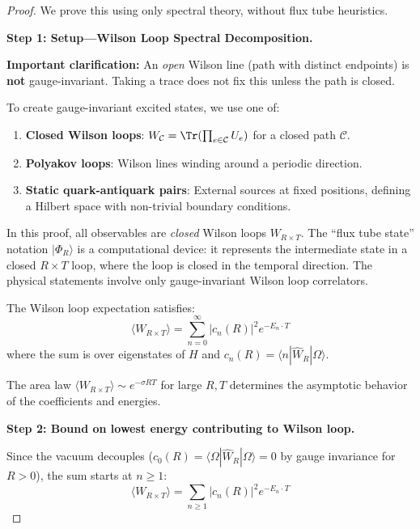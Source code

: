\begin{proof}
We prove this using only spectral theory, without flux tube heuristics.

\textbf{Step 1: Setup---Wilson Loop Spectral Decomposition.}

\begin{tcolorbox}[colback=yellow!5, colframe=yellow!75!black, title=\textbf{Gauge Invariance---Rigorous Treatment}]
\textbf{Important clarification:} An \emph{open} Wilson line (path with distinct 
endpoints) is \textbf{not} gauge-invariant. Taking a trace does not fix this 
unless the path is closed.

To create gauge-invariant excited states, we use one of:
\begin{enumerate}
\item \textbf{Closed Wilson loops}: $W_{\mathcal{C}} = \Tr(\prod_{e \in \mathcal{C}} U_e)$ 
for a closed path $\mathcal{C}$.
\item \textbf{Polyakov loops}: Wilson lines winding around a periodic direction.
\item \textbf{Static quark-antiquark pairs}: External sources at fixed positions, 
defining a Hilbert space with non-trivial boundary conditions.
\end{enumerate}

In this proof, all observables are \emph{closed} Wilson loops $W_{R \times T}$. 
The ``flux tube state'' notation $|\Phi_R\rangle$ is a computational device: 
it represents the intermediate state in a closed $R \times T$ loop, where the 
loop is closed in the temporal direction. The physical statements involve only 
gauge-invariant Wilson loop correlators.
\end{tcolorbox}

The Wilson loop expectation satisfies:
\[
\langle W_{R \times T} \rangle = \sum_{n=0}^\infty |c_n(R)|^2 e^{-E_n \cdot T}
\]
where the sum is over eigenstates of $H$ and $c_n(R) = \langle n | \hat{W}_R | \Omega \rangle$.

The area law $\langle W_{R \times T} \rangle \sim e^{-\sigma R T}$ for large $R, T$ 
determines the asymptotic behavior of the coefficients and energies.

\textbf{Step 2: Bound on lowest energy contributing to Wilson loop.}

Since the vacuum decouples ($c_0(R) = \langle \Omega | \hat{W}_R | \Omega \rangle = 0$ 
by gauge invariance for $R > 0$), the sum starts at $n \geq 1$:
\[
\langle W_{R \times T} \rangle = \sum_{n \geq 1} |c_n(R)|^2 e^{-E_n \cdot T}
\]


\end{proof}
